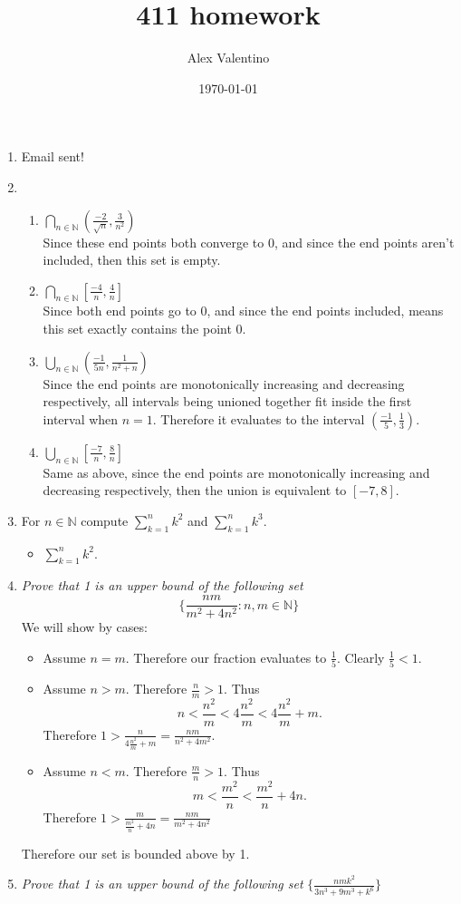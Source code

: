 \documentclass[12pt, letterpaper]{article}
\date{\today}
\author{Alex Valentino}
\title{411 homework}
\newcommand{\N}{\mathbb{N}}
\begin{document}
\begin{enumerate}
	\item Email sent!
	\item 
	\begin{enumerate}
	
	
		\item $\bigcap_{n \in \N} (\frac{-2}{\sqrt{n}}, \frac{3}{n^2})$\\
	Since these end points both converge to 0, and since the end points aren't included, then this set is empty.
		\item $\bigcap_{n \in \N} [\frac{-4}{n},\frac{4}{n}]$\\
		Since both end points go to 0, and since the end points included, means this set exactly contains the point 0.
		\item $\bigcup_{n \in \N} (\frac{-1}{5n}, \frac{1}{n^2+n})$\\
		Since the end points are monotonically increasing and decreasing respectively, all intervals being unioned together fit inside the first interval when $n=1$.  Therefore it evaluates to the interval $(\frac{-1}{5},\frac{1}{3})$.
		\item $\bigcup_{n \in \N} [\frac{-7}{n}, \frac{8}{n}]$\\
		Same as above, since the end points are monotonically increasing and decreasing respectively, then the union is equivalent to $[-7,8]$.   	
	\end{enumerate}
	\item For $n \in \N$ compute $\sum_{k=1}^n k^2$ and $\sum_{k=1}^n k^3$.
	\begin{itemize}
		\item $\sum_{k=1}^n k^2$.  
	\end{itemize}
	\item \textit{Prove that 1 is an upper bound of the following set}
	$$
	\{\frac{nm}{m^2 + 4n^2} : n,m \in \N\}
	$$
	We will show by cases:
	\begin{itemize}
		\item Assume $n = m$.  Therefore our fraction evaluates to $\frac{1}{5}$.
		Clearly $\frac{1}{5} < 1$.  
		\item Assume $n > m$.  Therefore $\frac{n}{m}> 1$.  Thus 
		$$
		n < \frac{n^2}{m} < 4\frac{n^2}{m} < 4\frac{n^2}{m} + m.
		$$
		Therefore $1 > \frac{n}{4\frac{n^2}{m}  + m} = \frac{nm}{n^2 + 4m^2}$.
		\item Assume $n < m$.  Therefore $\frac{m}{n}> 1$.  Thus 
		$$
		m < \frac{m^2}{n} < \frac{m^2}{n} + 4n.
		$$
		Therefore $1 > \frac{m}{\frac{m^2}{n} + 4n} = \frac{nm}{m^2 + 4n^2}$
	\end{itemize}
	Therefore our set is bounded above by 1.
	\item \textit{Prove that 1 is an upper bound of the following set}
	$
	\{\frac{nmk^2}{3n^3 + 9m^3 + k^6}\}
	$\\
	

\end{enumerate}
\end{document}
